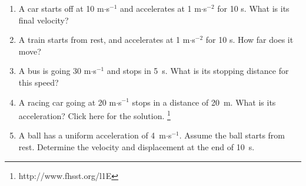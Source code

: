           \label{m38796*id79517}\begin{enumerate}[noitemsep, label=\textbf{\arabic*}. ] 
            \label{m38796*uid144}\item A car starts off at 10 m\begin{math}\ensuremath{\cdot}\end{math}s\begin{math}{}^{-1}\end{math} and accelerates at 1 m\begin{math}\ensuremath{\cdot}\end{math}s\begin{math}{}^{-2}\end{math} for 10 s. What is its final velocity?\newline
            
\label{m38796*uid145}\item A train starts from rest, and accelerates at 1 m\begin{math}\ensuremath{\cdot}\end{math}s\begin{math}{}^{-2}\end{math} for 10 s. How far does it move?\newline
            
\label{m38796*uid146}\item A bus is going 30 m\begin{math}\ensuremath{\cdot}\end{math}s\begin{math}{}^{-1}\end{math} and stops in 5~s. What is its stopping distance for this speed?\newline
            
\label{m38796*uid147}\item A racing car going at 20 m\begin{math}\ensuremath{\cdot}\end{math}s\begin{math}{}^{-1}\end{math} stops in a distance of 20~m. What is its acceleration?\newline
    Click here for the solution.\newline
    \footnote{http://www.fhsst.org/l1E}
        
\label{m38796*uid148}\item A ball has a uniform acceleration of 4~m\begin{math}\ensuremath{\cdot}\end{math}s\begin{math}{}^{-1}\end{math}. Assume the ball starts from rest. Determine the velocity and displacement at the end of 10~s.\newline
            

\end{enumerate}
